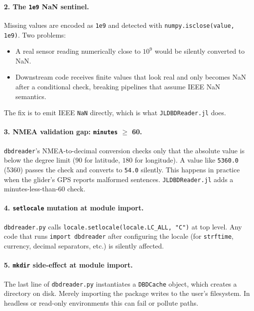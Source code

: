\documentclass[11pt]{article}
\begin{document}
\paragraph{2. The \texttt{1e9} NaN sentinel.}
Missing values are encoded as \texttt{1e9} and detected with
\texttt{numpy.isclose(value, 1e9)}.  Two problems:
\begin{itemize}[leftmargin=*,topsep=1pt,itemsep=0pt]
  \item A real sensor reading numerically close to $10^9$ would be
        silently converted to NaN.
  \item Downstream code receives finite values that look real and only
        becomes NaN after a conditional check, breaking pipelines that
        assume IEEE NaN semantics.
\end{itemize}
The fix is to emit IEEE \texttt{NaN} directly, which is what
\texttt{JLDBDReader.jl} does.

\paragraph{3. NMEA validation gap: \texttt{minutes} $\geq$ 60.}
\texttt{dbdreader}'s NMEA-to-decimal conversion checks only that the
absolute value is below the degree limit ($90$ for latitude, $180$ for
longitude).  A value like \texttt{5360.0} (53\textdegree{}60\textquotesingle) passes the
check and converts to \texttt{54.0\textdegree{}} silently.  This happens in
practice when the glider's GPS reports malformed sentences.
\texttt{JLDBDReader.jl} adds a minutes-less-than-60 check.

\paragraph{4. \texttt{setlocale} mutation at module import.}
\texttt{dbdreader.py} calls \texttt{locale.setlocale(locale.LC\_ALL, "C")}
at top level.  Any code that runs \texttt{import dbdreader} after
configuring the locale (for \texttt{strftime}, currency, decimal
separators, etc.) is silently affected.

\paragraph{5. \texttt{mkdir} side-effect at module import.}
The last line of \texttt{dbdreader.py} instantiates a \texttt{DBDCache} object,
which creates a directory on disk.  Merely importing the package writes to
the user's filesystem.  In headless or read-only environments this can
fail or pollute paths.
\end{document}
